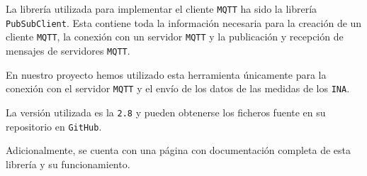 La librería utilizada para implementar el cliente \texttt{MQTT} ha sido la librería \texttt{PubSubClient}.  Esta contiene toda la información necesaria para la creación de un cliente \texttt{MQTT}, la conexión con un servidor \texttt{MQTT} y la publicación y recepción de mensajes de servidores \texttt{MQTT}.

En nuestro proyecto hemos utilizado esta herramienta únicamente para la conexión con el servidor \texttt{MQTT} y el envío de los datos de las medidas de los \texttt{INA}.

La versión utilizada es la \texttt{2.8} y pueden obtenerse los ficheros fuente en su repositorio en \texttt{GitHub}. \cite{olearyKnollearyPubsubclient2024}

Adicionalmente, se cuenta con una página con documentación completa de esta librería y su funcionamiento. \cite{nickolearyArduinoClientMQTT}